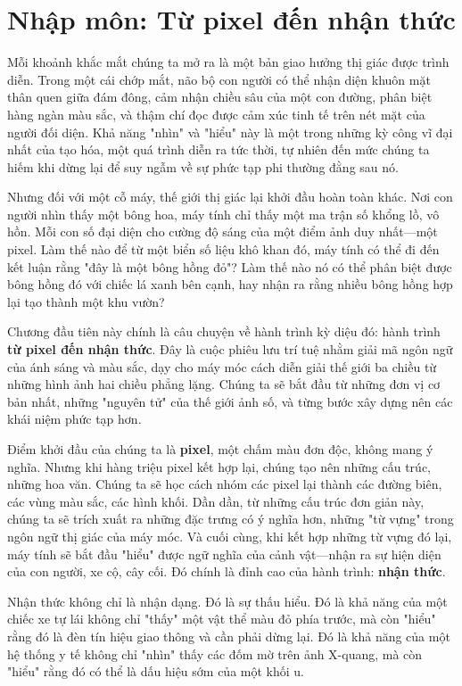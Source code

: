 \chapter{Nhập môn: Từ pixel đến nhận thức}
\label{chap:nhap_mon}

Mỗi khoảnh khắc mắt chúng ta mở ra là một bản giao hưởng thị giác được trình diễn. Trong một cái chớp mắt, não bộ con người có thể nhận diện khuôn mặt thân quen giữa đám đông, cảm nhận chiều sâu của một con đường, phân biệt hàng ngàn màu sắc, và thậm chí đọc được cảm xúc tinh tế trên nét mặt của người đối diện. Khả năng "nhìn" và "hiểu" này là một trong những kỳ công vĩ đại nhất của tạo hóa, một quá trình diễn ra tức thời, tự nhiên đến mức chúng ta hiếm khi dừng lại để suy ngẫm về sự phức tạp phi thường đằng sau nó.

Nhưng đối với một cỗ máy, thế giới thị giác lại khởi đầu hoàn toàn khác. Nơi con người nhìn thấy một bông hoa, máy tính chỉ thấy một ma trận số khổng lồ, vô hồn. Mỗi con số đại diện cho cường độ sáng của một điểm ảnh duy nhất—một pixel. Làm thế nào để từ một biển số liệu khô khan đó, máy tính có thể đi đến kết luận rằng "đây là một bông hồng đỏ"? Làm thế nào nó có thể phân biệt được bông hồng đó với chiếc lá xanh bên cạnh, hay nhận ra rằng nhiều bông hồng hợp lại tạo thành một khu vườn?

Chương đầu tiên này chính là câu chuyện về hành trình kỳ diệu đó: hành trình \textbf{từ pixel đến nhận thức}. Đây là cuộc phiêu lưu trí tuệ nhằm giải mã ngôn ngữ của ánh sáng và màu sắc, dạy cho máy móc cách diễn giải thế giới ba chiều từ những hình ảnh hai chiều phẳng lặng. Chúng ta sẽ bắt đầu từ những đơn vị cơ bản nhất, những "nguyên tử" của thế giới ảnh số, và từng bước xây dựng nên các khái niệm phức tạp hơn.

Điểm khởi đầu của chúng ta là \textbf{pixel}, một chấm màu đơn độc, không mang ý nghĩa. Nhưng khi hàng triệu pixel kết hợp lại, chúng tạo nên những cấu trúc, những hoa văn. Chúng ta sẽ học cách nhóm các pixel lại thành các đường biên, các vùng màu sắc, các hình khối. Dần dần, từ những cấu trúc đơn giản này, chúng ta sẽ trích xuất ra những đặc trưng có ý nghĩa hơn, những "từ vựng" trong ngôn ngữ thị giác của máy móc. Và cuối cùng, khi kết hợp những từ vựng đó lại, máy tính sẽ bắt đầu "hiểu" được ngữ nghĩa của cảnh vật—nhận ra sự hiện diện của con người, xe cộ, cây cối. Đó chính là đỉnh cao của hành trình: \textbf{nhận thức}.

Nhận thức không chỉ là nhận dạng. Đó là sự thấu hiểu. Đó là khả năng của một chiếc xe tự lái không chỉ "thấy" một vật thể màu đỏ phía trước, mà còn "hiểu" rằng đó là đèn tín hiệu giao thông và cần phải dừng lại. Đó là khả năng của một hệ thống y tế không chỉ "nhìn" thấy các đốm mờ trên ảnh X-quang, mà còn "hiểu" rằng đó có thể là dấu hiệu sớm của một khối u.

